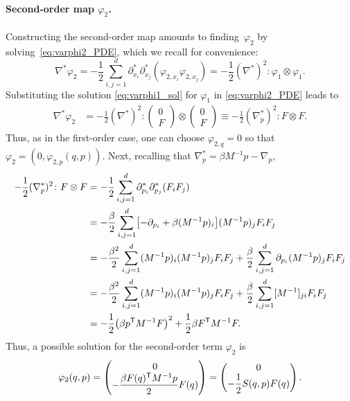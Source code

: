 \paragraph{Second-order map $\varphi_2$.} Constructing the second-order map amounts to finding~$\varphi_2$ by solving~\eqref{eq:varphi2_PDE}, which we recall for convenience:
%
\begin{equation}
	\nabla^*\varphi_2 = -\frac{1}{2}\sum_{i,j=1}^d \partial_{x_i}^*\partial_{x_j}^* (\varphi_{2,x_i}\varphi_{2,x_j}) = -\frac{1}{2}(\nabla^*)^2 \colon \varphi_1\otimes \varphi_1.
\end{equation}
%
Substituting the solution \eqref{eq:varphi1_sol} for $\varphi_1$ in \eqref{eq:varphi2_PDE} leads to
%
\begin{align}
    \nabla^*\varphi_2 &= -\frac{1}{2}(\nabla^*)^2\colon 
    \begin{pmatrix}
        0 \\ F    
    \end{pmatrix} \otimes 
    \begin{pmatrix}
        0 \\ F    
    \end{pmatrix} \equiv -\frac{1}{2}(\nabla_p^*)^2 \colon F\otimes F.
\end{align}
%
Thus, as in the first-order case, one can choose $\varphi_{2,q} = 0$ so that $\varphi_2 = (0, \varphi_{2,p}(q,p))$. Next, recalling that $\nabla^*_p = \beta M^{-1}p - \nabla_p$,
%
\begin{align}
    -\frac{1}{2}(\nabla_p^*)^2 \colon F\otimes F &= -\frac{1}{2}\sum_{i,j=1}^d \partial_{p_i}^*\partial_{p_j}^* \paren*{F_i F_j} \\
    &= -\frac{\beta}{2}\sum_{i,j=1}^d \bkt*{-\partial_{p_i} + \beta (M^{-1}p)_i}(M^{-1}p)_j F_i F_j \\
    &= -\frac{\beta^2}{2}\sum_{i,j=1}^d (M^{-1}p)_i(M^{-1}p)_j F_i F_j + \frac{\beta}{2} \sum_{i,j=1}^d \partial_{p_i}(M^{-1}p)_j F_iF_j \\
    &= -\frac{\beta^2}{2}\sum_{i,j=1}^d (M^{-1}p)_i(M^{-1}p)_j F_i F_j +\frac{\beta}{2}\sum_{i,j=1}^d [M^{-1}]_{ji} F_i F_j \\
    &= -\frac{1}{2}\paren*{\beta p^\t M^{-1}F}^2 + \frac{1}{2}\beta F^\t M^{-1}F.
\end{align}
%
Thus, a possible solution for the second-order term $\varphi_2$ is
%
\begin{equation}
    \varphi_2(q,p) = 
    \begin{pmatrix}
        0 \\ -\dfrac{\beta F(q)^\mathsf T M^{-1} p}{2}F(q)
    \end{pmatrix} = 
    \begin{pmatrix}
        0 \\ -\dfrac{1}{2}S(q,p)F(q)
    \end{pmatrix}.
\end{equation}
